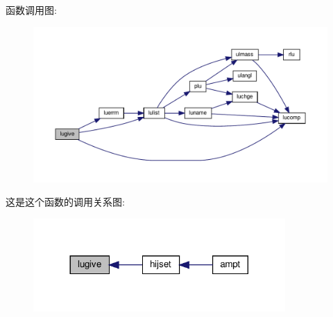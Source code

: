 函数调用图\+:
\nopagebreak
\begin{figure}[H]
\begin{center}
\leavevmode
\includegraphics[width=350pt]{lugive_8f90_afe4c8edd4d30290e109648ea698a118f_cgraph}
\end{center}
\end{figure}
这是这个函数的调用关系图\+:
\nopagebreak
\begin{figure}[H]
\begin{center}
\leavevmode
\includegraphics[width=272pt]{lugive_8f90_afe4c8edd4d30290e109648ea698a118f_icgraph}
\end{center}
\end{figure}
